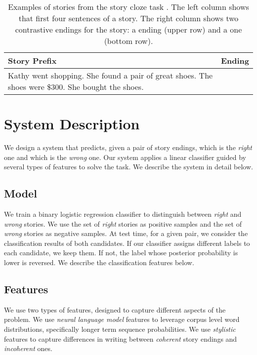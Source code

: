 \documentclass[a4paper,11pt]{article}
\newcommand{\isubsectionb}[1]{\subsection{#1}\label{ssec:#1}}
\begin{document}
\begin{table}[!t]
\begin{tabular}{|p{3.5cm}|p{3.25cm}|} \hline
{\bf Story Prefix} & {\bf Ending} \\ \hline
\multirow{2}{*}{\parbox[b][7.5em][c]{3.5cm}{Kathy went shopping. She found a pair of great shoes. The shoes were \$300. She bought the shoes.}}	&{\color{blue}{She felt buyer's remorse after the purchase.}} \\ \cline{2-2}
& {\color{red}{Kathy hated buying shoes.}} \\ \hline
\end{tabular}
\caption{\label{ROC-example}
Examples of stories from the story cloze task \cite{Mostafazadeh:2016}. 
The left column shows that first four sentences of a story. 
The right column shows two contrastive endings for the story:
  a {\color{blue}{coherent}} ending (upper row) and a {\color{red}{incoherent}} one (bottom row).
}
\end{table}


\section{System Description}
We design a system that predicts, given a pair of story endings, which is the  \textit{right} one and which is the \textit{wrong} one.
Our system applies a linear classifier guided by several types of features to solve the task.
We describe the system in detail below.

\subsection{Model}
We train a binary logistic regression classifier to distinguish between {\it right} and {\it wrong} stories. 
We use the set of {\it right} stories as positive samples and the set of {\it wrong} stories as negative samples.
At test time, for a given pair, we consider the classification results of both candidates. 
If our classifier assigns different labels to each candidate, we keep them.  
If not, the label whose posterior probability is lower is reversed.
We describe the classification features below.

\isubsectionb{Features}
We use two types of features, designed to capture different aspects of the problem. 
We use \textit{neural language model} features to leverage corpus level word distributions, specifically longer term sequence probabilities.
We use \textit{stylistic} features to capture differences in writing between {\it coherent} story endings and {\it incoherent} ones. 
\end{document}
